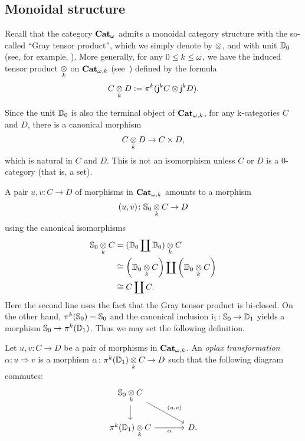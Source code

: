 \subsection{Monoidal structure}\label{subsec:monoidal}


\begin{paragr}\label{paragr:gray}
  Recall that the category $\mathbf{Cat}_{\omega}$ admits a monoidal category
  structure with the so-called ``Gray tensor product'',
  which we simply denote by $\otimes$, and with unit $\mathbb{D}_{0}$ (see, for example,
  \cite[Appendice A]{ara_maltsiniotis:joint}). More generally, for any $0 \leq k \leq \omega$, we have
  the induced tensor product $\underset{k}{\otimes}$ on $\mathbf{Cat}_{\omega,k}$
  (see~\cite[Section 6]{ara_lucas:folmon}) defined by the
  formula
  \[
    C \underset{k}{\otimes} D :=\mathsf{\pi}_{}^{k}(\mathsf{j}_{}^{k}C\otimes \mathsf{j}_{}^{k}D).
  \]
  
  Since the unit $\mathbb{D}_{0}$ is also the terminal object of $\mathbf{Cat}_{\omega,k}$,
  for any \ook k\nbd-categories $C$ and $D$, there is a canonical
  morphism
  \[
    C\underset{k}{\otimes} D \to C \times D,
  \]
  which is natural in $C$ and $D$. This is not an isomorphism unless
  $C$ or $D$ is a $0$\nbd-category (that is, a set).

  
  A pair $u, v \colon C \to D$ of morphisms in $\mathbf{Cat}_{\omega,k}$ amounts to
  a morphism
  \[(u,v)\colon \mathbb{S}_{0}\underset{k}{\otimes}C\to D\]
  using the canonical isomorphisms
   \[
    \begin{aligned}
      \mathbb{S}_{0}\underset{k}{\otimes}C &=(\mathbb{D}_{0}\coprod \mathbb{D}_{0})\underset{k}{\otimes}C \\
      &\cong \left(\mathbb{D}_{0}\underset{k}{\otimes}C\right)\coprod
        \left(\mathbb{D}_{0}\underset{k}{\otimes}C\right) \\
      &\cong C \coprod C.
    \end{aligned}
  \]
  Here the second line uses the fact that the Gray tensor product is
  bi-closed. On the other hand, $\mathsf{\pi}_{}^{k}(\mathbb{S}_{0})=\mathbb{S}_{0}$ and the
  canonical inclusion $\mathsf{i}_{1}\colon\mathbb{S}_{0}\to \mathbb{D}_{1}$ yields  a
  morphism $\mathbb{S}_{0}\to \mathsf{\pi}_{}^{k}(\mathbb{D}_{1})$. Thus we may set the
  following definition.
\end{paragr}
\begin{definition}\label{def:oplax}
  Let $u,v\colon C\to D$ be a pair of morphisms in $\mathbf{Cat}_{\omega,k}$. An {\em
    oplax transformation} $\alpha\colon u \Rightarrow v$ is a morphism
$ \alpha \colon \mathsf{\pi}_{}^{k}(\mathbb{D}_{1})\underset{k}{\otimes}C \to D$
  such that the following diagram commutes:
  \[
    \begin{tikzcd}[column sep=large]
      \Sph{0}\grayk{k} C \ar[d] \ar[dr,"{\left(u,v\right)}"] & \\
      \opifun{k}(\Dsk{1})\grayk{k}C \ar[r,"\alpha"'] & D. 
    \end{tikzcd}
  \]
\end{definition}
  
